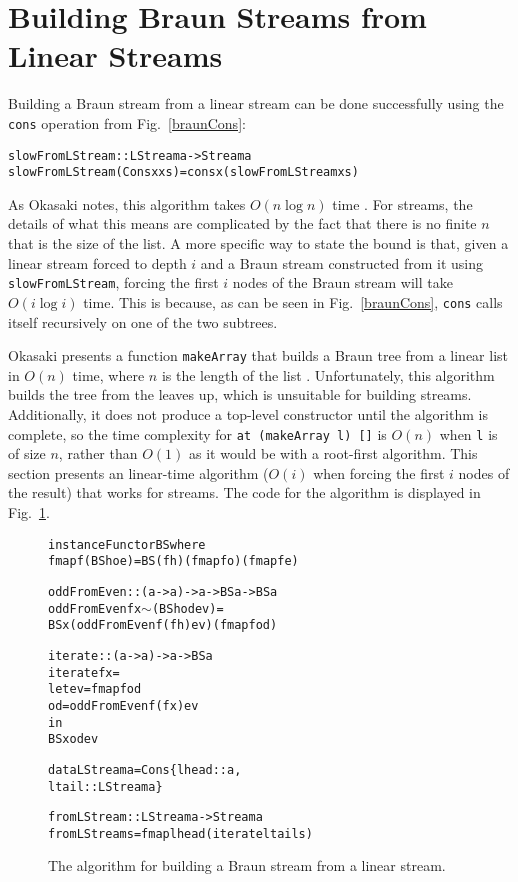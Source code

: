\documentclass[envcountsect]{llncs}
\begin{document}
\section{Building Braun Streams from Linear Streams}
\label{iterSect}

Building a Braun stream from a linear stream can be done successfully using the {\tt cons} operation from Fig.~\ref{braunCons}:

\begin{alltt}
slowFromLStream :: LStream a -> Stream a
slowFromLStream (Cons x xs) = cons x (slowFromLStream xs)
\end{alltt}

As Okasaki notes, this algorithm takes $O(n \log n)$ time \cite{okasakiBraun}.
For streams, the details of what this means are complicated by the fact that there is no finite $n$ that is the size of the list.
A more specific way to state the bound is that, given a linear stream forced to depth $i$ and a Braun stream constructed from it using {\tt slowFromLStream}, forcing the first $i$ nodes of the Braun stream will take $O(i \log i)$ time.
This is because, as can be seen in Fig.~\ref{braunCons}, {\tt cons} calls itself recursively on one of the two subtrees.

Okasaki presents a function {\tt makeArray} that builds a Braun tree from a linear list in $O(n)$ time, where $n$ is the length of the list \cite{okasakiBraun}.
Unfortunately, this algorithm builds the tree from the leaves up, which is unsuitable for building streams.
Additionally, it does not produce a top-level constructor until the algorithm is complete, so the time complexity for {\tt at (makeArray l) []} is $O(n)$ when {\tt l} is of size $n$, rather than $O(1)$ as it would be with a root-first algorithm.
This section presents an linear-time algorithm ($O(i)$ when forcing the first $i$ nodes of the result) that works for streams.
The code for the algorithm is displayed in Fig.~\ref{iterateCode}.

\begin{figure}
\begin{alltt}
instance Functor BS where
    fmap f (BS h o e) = BS (f h) (fmap f o) (fmap f e)

oddFromEven :: (a -> a) -> a -> BS a -> BS a
oddFromEven f x  \(\sim\)(BS h od ev) =
    BS x (oddFromEven f (f h) ev) (fmap f od)

iterate :: (a -> a) -> a -> BS a
iterate f x =
    let ev = fmap f od
        od = oddFromEven f (f x) ev
    in
      BS x od ev

data LStream a = Cons \{lhead::a,
                       ltail::LStream a\}

fromLStream :: LStream a -> Stream a
fromLStream s = fmap lhead (iterate ltail s)
\end{alltt}
\caption{The algorithm for building a Braun stream from a linear stream.}
\label{iterateCode}
\end{figure}
\end{document}
